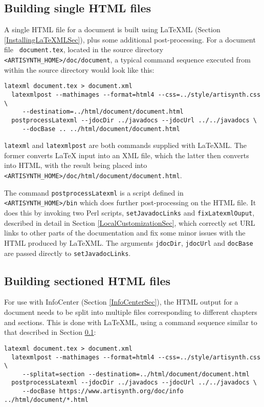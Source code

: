 \documentclass{article}
\begin{document}
\subsection{Building single HTML files}
\label{BuildingSingleHTMLSec}

A single HTML file for a document is built
using LaTeXML (Section \ref{InstallingLaTeXMLSec}), plus some
additional post-processing. For a document file {\tt
document.tex}, located in the source directory {\tt
<ARTISYNTH\_HOME>/doc/document}, a typical command sequence 
executed from within the source directory would look like this:

\begin{lstlisting}[]
  latexml document.tex > document.xml
  latexmlpost --mathimages --format=html4 --css=../style/artisynth.css \
     --destinatiom=../html/document/document.html
  postprocessLatexml --jdocDir ../javadocs --jdocUrl ../../javadocs \
     --docBase .. ../html/document/document.html
\end{lstlisting}

{\tt latexml} and {\tt latexmlpost} are both commands supplied with
LaTeXML. The former converts LaTeX input into an XML file, which the
latter then converts into HTML, with the result being placed into {\tt
<ARTISYNTH\_HOME>/doc/html/document/document.html}.

The command {\tt postprocessLatexml} is a script defined in {\tt
<ARTISYNTH\_HOME>/bin} which does further post-processing on the HTML
file. It does this by invoking two Perl scripts, {\tt setJavadocLinks}
and {\tt fixLatexmlOuput}, described in detail in Section
\ref{LocalCustomizationSec}, which correctly set URL links to other
parts of the documentation and fix some minor issues with the HTML
produced by LaTeXML. The arguments {\tt \DHY jdocDir}, {\tt \DHY jdocUrl}
and {\tt \DHY docBase} are passed directly to {\tt setJavadocLinks}.

\subsection{Building sectioned HTML files}
\label{BuildingSectionedHTMLSec}

For use with InfoCenter (Section \ref{InfoCenterSec}), the HTML output
for a document needs to be split into multiple files corresponding to
different chapters and sections. This is done with LaTeXML, using a
command sequence similar to that described in
Section \ref{BuildingSingleHTMLSec}:

\begin{lstlisting}[]
  latexml document.tex > document.xml
  latexmlpost --mathimages --format=html4 --css=../style/artisynth.css \
     --splitat=section --destinatiom=../html/document/document.html
  postprocessLatexml --jdocDir ../javadocs --jdocUrl ../../javadocs \
     --docBase https://www.artisynth.org/doc/info ../html/document/*.html
\end{lstlisting}
\end{document}
